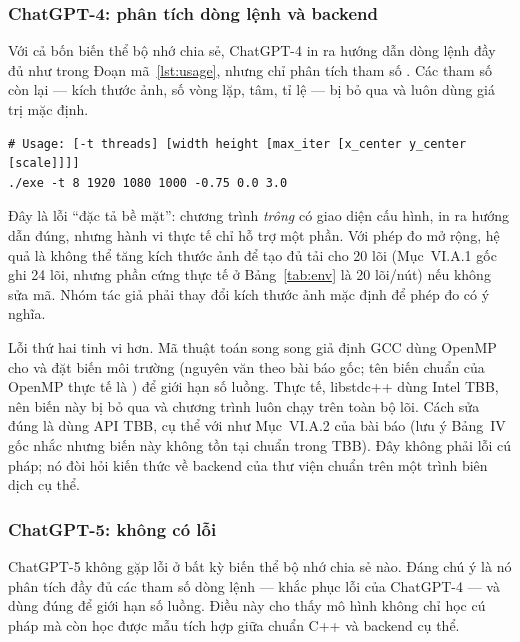 \subsubsection{ChatGPT-4: phân tích dòng lệnh và backend}

Với cả bốn biến thể bộ nhớ chia sẻ, ChatGPT-4 in ra hướng dẫn dòng lệnh đầy đủ
như trong Đoạn mã~\ref{lst:usage}, nhưng chỉ phân tích tham số . Các
tham số còn lại — kích thước ảnh, số vòng lặp, tâm, tỉ lệ — bị bỏ qua và luôn
dùng giá trị mặc định.

\begin{lstlisting}[language={},caption={Hướng dẫn dòng lệnh do ChatGPT-4 sinh (Listing 1 trong bài báo gốc).},label={lst:usage},numbers=none,basicstyle=\ttfamily\small]
# Usage: [-t threads] [width height [max_iter [x_center y_center [scale]]]]
./exe -t 8 1920 1080 1000 -0.75 0.0 3.0
\end{lstlisting}

Đây là lỗi “đặc tả bề mặt”: chương trình \emph{trông} có giao diện cấu hình, in
ra hướng dẫn đúng, nhưng hành vi thực tế chỉ hỗ trợ một phần. Với phép đo mở rộng,
hệ quả là không thể tăng kích thước ảnh để tạo đủ tải cho 20 lõi (Mục~VI.A.1 gốc
ghi 24 lõi, nhưng phần cứng thực tế ở Bảng~\ref{tab:env} là 20 lõi/nút) nếu không
sửa mã. Nhóm tác giả phải thay đổi kích thước ảnh mặc định để phép đo có ý nghĩa.

Lỗi thứ hai tinh vi hơn. Mã thuật toán song song giả định GCC dùng OpenMP cho
 và đặt biến môi trường 
(nguyên văn theo bài báo gốc; tên biến chuẩn của OpenMP thực tế là
) để giới hạn số luồng. Thực tế, libstdc++ dùng Intel
TBB, nên biến này bị bỏ qua và chương trình luôn chạy trên toàn bộ lõi. Cách sửa
đúng là dùng API TBB, cụ thể  với
 như Mục~VI.A.2 của bài báo (lưu ý Bảng~IV gốc
nhắc  nhưng biến này không tồn tại chuẩn trong TBB). Đây
không phải lỗi cú pháp; nó đòi hỏi kiến thức về backend của thư viện chuẩn trên
một trình biên dịch cụ thể.

\subsubsection{ChatGPT-5: không có lỗi}

ChatGPT-5 không gặp lỗi ở bất kỳ biến thể bộ nhớ chia sẻ nào. Đáng chú ý là nó
phân tích đầy đủ các tham số dòng lệnh — khắc phục lỗi của ChatGPT-4 — và dùng
đúng  để giới hạn số luồng. Điều này cho thấy mô hình
không chỉ học cú pháp mà còn học được mẫu tích hợp giữa chuẩn C++ và backend cụ
thể.

